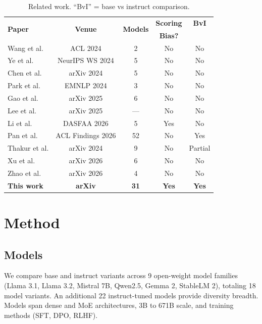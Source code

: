\documentclass[11pt,a4paper]{article}
\begin{document}
\begin{table}[h]
\centering\small
\caption{Related work. ``BvI'' = base vs instruct comparison.}
\label{tab:related}
\begin{tabular}{lcccc}
\toprule
\multirow{2}{*}{\textbf{Paper}} & \multirow{2}{*}{\textbf{Venue}} & \multirow{2}{*}{\textbf{Models}} & \textbf{Scoring} & \textbf{BvI} \\
& & & \textbf{Bias?} & \\
\midrule
Wang et al. \cite{wang2023large} & ACL 2024 & 2 & No & No \\
Ye et al. \cite{ye2024justice} & NeurIPS WS 2024 & 5 & No & No \\
Chen et al. \cite{chen2024humans} & arXiv 2024 & 5 & No & No \\
Park et al. \cite{park2024offsetbias} & EMNLP 2024 & 3 & No & No \\
Gao et al. \cite{gao2025evaluating} & arXiv 2025 & 6 & No & No \\
Lee et al. \cite{lee2025correctly} & arXiv 2025 & --- & No & No \\
Li et al. \cite{li2025scoring} & DASFAA 2026 & 5 & Yes & No \\
Pan et al. \cite{pan2025user} & ACL Findings 2026 & 52 & No & Yes \\
Thakur et al. \cite{thakur2024judging} & arXiv 2024 & 9 & No & Partial \\
Xu et al. \cite{xu2026position} & arXiv 2026 & 6 & No & No \\
Zhao et al. \cite{zhao2026bias} & arXiv 2026 & 4 & No & No \\
\midrule
\textbf{This work} & \textbf{arXiv} & \textbf{31} & \textbf{Yes} & \textbf{Yes} \\
\bottomrule
\end{tabular}
\end{table}

\section{Method}

\subsection{Models}
We compare base and instruct variants across 9 open-weight model families (Llama 3.1, Llama 3.2, Mistral 7B, Qwen2.5, Gemma 2, StableLM 2), totaling 18 model variants. An additional 22 instruct-tuned models provide diversity breadth. Models span dense and MoE architectures, 3B to 671B scale, and training methods (SFT, DPO, RLHF).
\end{document}

